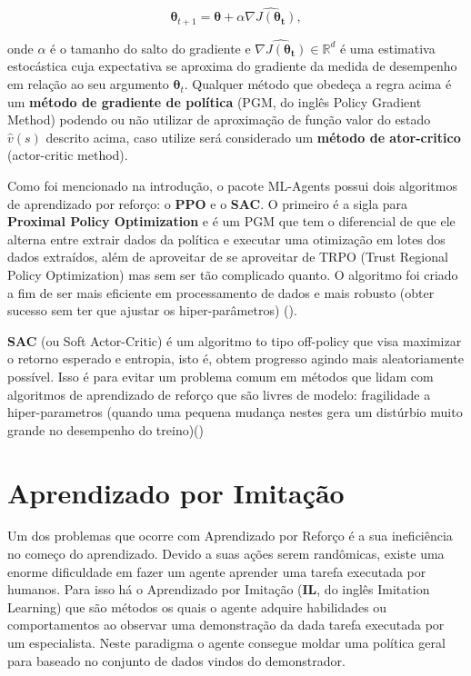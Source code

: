 \begin{equation}
   \mathbf{\theta}_{t+1} = \mathbf{\theta} + \alpha \widehat{\nabla J (\mathbf{\theta_t})},
\end{equation}

onde $\alpha$ é o tamanho do salto do gradiente e $\widehat{\nabla J (\mathbf{\theta_t})} \in \mathbb{R}^d$ é uma estimativa estocástica cuja expectativa se aproxima do gradiente da medida de desempenho em relação ao seu argumento $\mathbf{\theta}_t$. Qualquer método que obedeça a regra acima é um \textbf{método de gradiente de política} (PGM, do inglês Policy Gradient Method) podendo ou não utilizar de aproximação de função valor do estado $\hat{v}(s)$ descrito acima, caso utilize será considerado um \textbf{método de ator-critico} (actor-critic method). 

Como foi mencionado na introdução, o pacote ML-Agents possui dois algoritmos de aprendizado por reforço: o \textbf{PPO} e o \textbf{SAC}. O primeiro é a sigla para \textbf{Proximal Policy Optimization} e é um PGM que tem o diferencial de que ele alterna entre extrair dados da política e executar uma otimização em lotes dos dados extraídos, além de aproveitar de se aproveitar de TRPO (Trust Regional Policy Optimization) mas sem ser tão complicado quanto. O algoritmo foi criado a fim de ser mais eficiente em processamento de dados e mais robusto (obter sucesso sem ter que ajustar os hiper-parâmetros) ().

\textbf{SAC} (ou Soft Actor-Critic) é um algoritmo to tipo off-policy que visa maximizar o retorno esperado e entropia, isto é, obtem progresso agindo mais aleatoriamente possível. Isso é para evitar um problema comum em métodos que lidam com algoritmos de aprendizado de reforço que são livres de modelo: fragilidade a hiper-parametros (quando uma pequena mudança nestes gera um distúrbio muito grande no desempenho do treino)()


\section{Aprendizado por Imitação}
Um dos problemas que ocorre com Aprendizado por Reforço é a sua ineficiência no começo do aprendizado. Devido a suas ações serem randômicas, existe uma enorme dificuldade em fazer um agente aprender uma tarefa executada por humanos. Para isso há o Aprendizado por Imitação (\textbf{IL}, do inglês Imitation Learning) que são métodos os quais o agente adquire habilidades ou comportamentos ao observar uma demonstração da dada tarefa executada por um especialista. Neste paradigma o agente consegue moldar uma política geral para baseado no conjunto de dados vindos do demonstrador.


